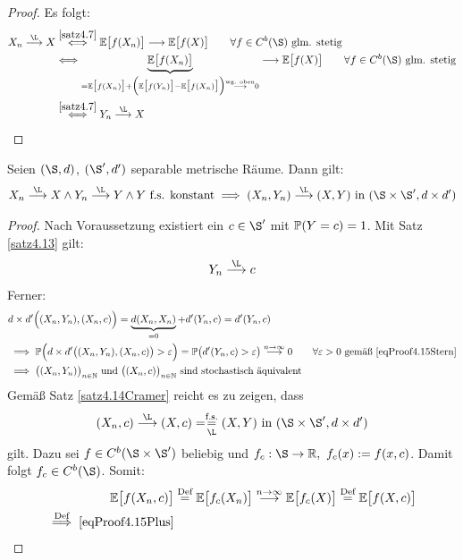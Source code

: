 \begin{proof}
Es folgt:
\begin{align*}
X_n\stackrel{\L}{\longrightarrow} X
&\stackrel{\ref{satz4.7}}{\Longleftrightarrow}
\E\big[f(X_n)\big]\longrightarrow\E\big[f(X)\big]\qquad\forall f\in C^b(\S)\text{ glm. stetig}\\
&\Longleftrightarrow
\underbrace{\E\big[f(X_n)\big]}_{=\E\big[f(X_n)\big]+\Big(\E\big[f(Y_n)\big]-\E\big[ f(X_n)\big]\Big)\stackrel{\text{wg. oben}}{\longrightarrow}0}\stackrel{}{\longrightarrow}\E\big[f(X)\big]\qquad\forall f\in C^b(\S)\text{ glm. stetig}\\
&\stackrel{\ref{satz4.7}}{\Longleftrightarrow}
Y_n\stackrel{\L}{\longrightarrow} X
\end{align*}
\end{proof}

\begin{satz}\label{satz4.15CramerSlutsky}\enter
Seien $(\S,d)$, $(\S',d')$ separable metrische Räume. Dann gilt:
\begin{align*}
X_n\stackrel{\L}{\longrightarrow} X\wedge Y_n\stackrel{\L}{\longrightarrow} Y\wedge Y\text{ f.s. konstant}
\implies (X_n,Y_n)\stackrel{\L}{\longrightarrow}(X,Y)\text{ in }(\S\times\S',d\times d')
\end{align*}
\end{satz}
\begin{proof}
Nach Voraussetzung existiert ein $c\in\S'$ mit $\P(Y=c)=1$. Mit Satz \ref{satz4.13} gilt:
\begin{align}\label{eqProof4.15Stern}
Y_n\stackrel{\L}{\longrightarrow} c
\end{align}
Ferner:
\begin{align*}
&d\times d'\Big((X_n,Y_n),(X_n,c)\Big)
=\underbrace{d(X_n,X_n)}_{=0}+d'(Y_n,c)
=d'(Y_n,c)\\
&\implies\P\Big(d\times d'\big((X_n,Y_n),(X_n,c)\big)>\varepsilon\Big)
=\P\big(d'(Y_n,c)>\varepsilon\big)
\stackrel{n\to\infty}{\longrightarrow} 0\qquad\forall\varepsilon>0\text{ gemäß } \eqref{eqProof4.15Stern}\\
&\implies
\big((X_n,Y_n)\big)_{n\in\N}\text{ und }\big((X_n,c)\big)_{n\in\N}\text{ sind stochastisch äquivalent}
\end{align*}
Gemäß Satz \ref{satz4.14Cramer} reicht es zu zeigen, dass
\begin{align}\label{eqProof4.15Plus}
(X_n,c)\stackrel{\L}{\longrightarrow}(X,c)=\stackrelnew{\L}{\text{f.s.}}{=}(X,Y)\text{ in }(\S\times\S',d\times d')
\end{align}
gilt. Dazu sei $f\in C^b(\S\times\S')$ beliebig und $f_c:\S\to\R,~f_c(x):=f(x,c)$. Damit folgt $f_c\in C^b(\S)$. Somit:
\begin{align*}
\E\big[f(X_n,c)\big]
&\stackeq{\text{Def}}
\E\big[f_c(X_n)\big]
\stackrel{n\to\infty}{\longrightarrow}\E\big[f_c(X)\big]\stackeq{\text{Def}}
\E\big[f(X,c)\big]\\
\stackrel{\text{Def}}{\implies}
\eqref{eqProof4.15Plus}
\end{align*}
\end{proof}

